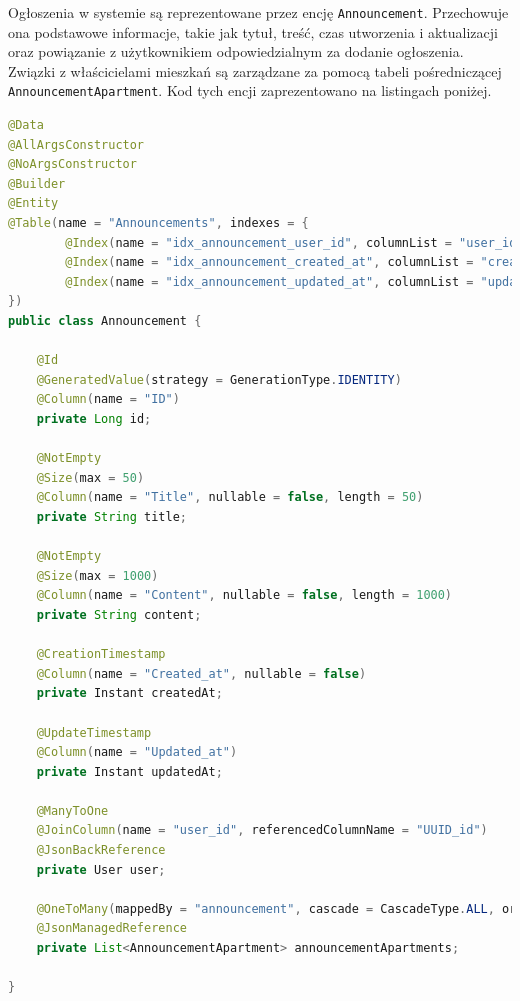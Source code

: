 Ogłoszenia w systemie są reprezentowane przez encję \texttt{Announcement}. Przechowuje ona podstawowe informacje, takie jak tytuł, treść, czas utworzenia i aktualizacji oraz powiązanie z użytkownikiem odpowiedzialnym za dodanie ogłoszenia. Związki z właścicielami mieszkań są zarządzane za pomocą tabeli pośredniczącej \texttt{AnnouncementApartment}. Kod tych encji zaprezentowano na listingach poniżej.


\begin{lstlisting}[language=Java, style=JavaStyle, caption=Encja \texttt{Announcement}]
@Data
@AllArgsConstructor
@NoArgsConstructor
@Builder
@Entity
@Table(name = "Announcements", indexes = {
        @Index(name = "idx_announcement_user_id", columnList = "user_id"),
        @Index(name = "idx_announcement_created_at", columnList = "created_at"),
        @Index(name = "idx_announcement_updated_at", columnList = "updated_at")
})
public class Announcement {

    @Id
    @GeneratedValue(strategy = GenerationType.IDENTITY)
    @Column(name = "ID")
    private Long id;

    @NotEmpty
    @Size(max = 50)
    @Column(name = "Title", nullable = false, length = 50)
    private String title;

    @NotEmpty
    @Size(max = 1000)
    @Column(name = "Content", nullable = false, length = 1000)
    private String content;

    @CreationTimestamp
    @Column(name = "Created_at", nullable = false)
    private Instant createdAt;

    @UpdateTimestamp
    @Column(name = "Updated_at")
    private Instant updatedAt;

    @ManyToOne
    @JoinColumn(name = "user_id", referencedColumnName = "UUID_id")
    @JsonBackReference
    private User user;

    @OneToMany(mappedBy = "announcement", cascade = CascadeType.ALL, orphanRemoval = true, fetch = FetchType.LAZY)
    @JsonManagedReference
    private List<AnnouncementApartment> announcementApartments;

}
\end{lstlisting}

